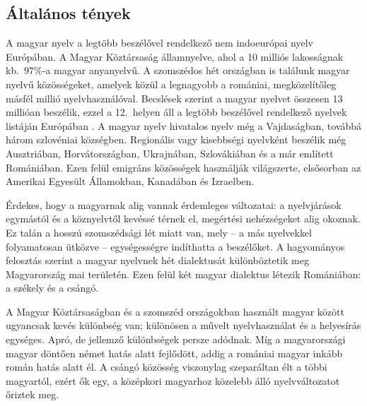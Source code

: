   \clearpage



  \begin{multicols}{2}

  \subsection{Általános tények}

  A magyar nyelv a legtöbb beszélővel rendelkező nem indoeurópai nyelv Európában. A Magyar Köztársaság államnyelve, ahol a 10 milliós lakosságnak kb.\ 97\%-a magyar anyanyelvű. A szomszédos hét országban is találunk ma\-gyar nyelvű közösségeket, amelyek közül a legnagyobb a romániai, megközelítőleg másfél millió nyelvhasználóval. Becs\-lé\-sek szerint a magyar nyelvet összesen 13 millióan beszélik, ezzel a 12.~helyen áll a legtöbb beszélővel rendelkező nyelvek listáján Európában \cite{didyouknow1}. A ma\-gyar nyelv hivatalos nyelv még a Vajdaságban, továbbá három szlovéniai községben. Regionális vagy kisebbségi nyelvként beszélik még Ausztriában, Horvátországban, Ukrajnában, Szlovákiában és a már említett Romániában. Ezen felül emig\-ráns közösségek használják világszerte, elsősorban az Amerikai Egyesült Államokban, Kanadában és Izraelben.   

  Érdekes, hogy a magyarnak alig vannak érdemleges változatai: a nyelvjárások egymástól és a köznyelvtől kevéssé térnek el, megértési nehézségeket alig okoznak. Ez talán a hosszú szomszédsági lét miatt van, mely -- a más nyelvekkel fo\-lya\-ma\-to\-san ütközve -- egységességre indíthatta a beszélőket. A hagyományos felosztás szerint a magyar nyelvnek hét dialektusát különböztetik meg Magyarország mai területén. Ezen felül két magyar dialektus létezik Romániában: a székely és a csángó.   

  A Magyar Köztársaságban és a szomszéd országokban használt magyar között ugyancsak kevés különbség van; különösen a művelt nyelvhasználat és a helyesírás egységes. Apró, de jellemző különbségek persze adódnak. Míg a magyarországi magyar döntően német hatás alatt fej\-lő\-dött, addig a romániai magyar inkább román hatás alatt él. A csángó közösség viszonylag szeparáltan élt a többi ma\-gyar\-tól, ezért ők egy, a középkori magyarhoz közelebb álló nyelvváltozatot őriztek meg. 


\end{multicols}
